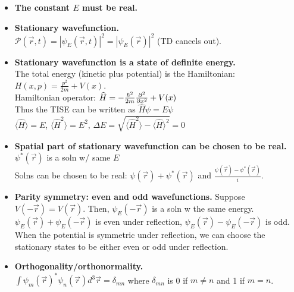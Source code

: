 \begin{itemize}[noitemsep,wide=0pt, leftmargin=\dimexpr{} + 2\relax]
    \item \textbf{The constant $E$ must be real.}
    
    \item \textbf{Stationary wavefunction.} \\
        $\mathcal{P}(\vec{r}, t) = |\psi_E(\vec{r}, t)|^2 = |\psi_E(\vec{r})|^2$ (TD cancels out).

    \item \textbf{Stationary wavefunction is a state of definite energy.} \\
        The total energy (kinetic plus potential) is the Hamiltonian: $H(x, p) = \frac{p^2}{2m} + V(x)$. \\

        Hamiltonian operator: $\widehat{H} = -\frac{\hbar^2}{2m} \pdv[2]{}{x} + V(x)$ \\
        Thus the TISE can be written as $\widehat{H} \psi = E \psi$ \\

        $\langle \widehat{H} \rangle = E$, $\langle \widehat{H} ^2 \rangle = E^2$, $\Delta E = \sqrt{\langle \widehat{H}^2 \rangle - \langle \widehat{H} \rangle ^2} = 0$

    \item \textbf{Spatial part of stationary wavefunction can be chosen to be real.} \\
        $\psi^*(\vec{r})$ is a soln w/ same $E$ \\
        Solns can be chosen to be real: $\psi(\vec{r}) + \psi^*(\vec{r})$ and $\frac{\psi(\vec{r}) - \psi^*(\vec{r})}{i}$.

    \item \textbf{Parity symmetry: even and odd wavefunctions.}
        Suppose $V(-\vec{r}) = V(\vec{r})$. Then, $\psi_E(-\vec{r})$ is a soln w the same energy. \\
        $\psi_E(\vec{r}) + \psi_E(-\vec{r})$ is even under reflection, $\psi_E(\vec{r}) - \psi_E(-\vec{r})$ is odd. \\
        When the potential is symmetric under reflection, we can choose the stationary states to be either even or odd under reflection.

    \item \textbf{Orthogonality/orthonormality.} \\
        $\int \psi_m (\vec{r})^* \psi_n (\vec{r}) d^3 \vec{r} = \delta_{mn}$ where $\delta_{mn}$ is 0 if $m \neq n$ and 1 if $m = n$.


\end{itemize}
